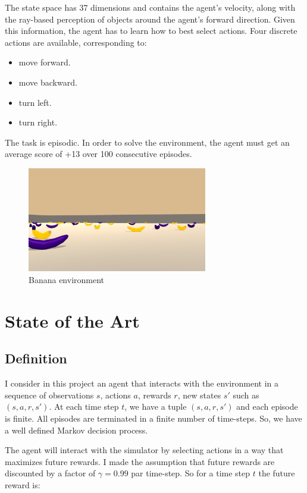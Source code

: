 \documentclass[12pt]{article}
\begin{document}
The state space has 37 dimensions and contains the agent's velocity, along with the ray-based perception of objects around the agent's forward direction. Given this information, the agent has to learn how to best select actions. Four discrete actions are available, corresponding to:

\begin{itemize}
\item move forward.
\item move backward.
\item turn left.
\item turn right.
\end{itemize}
 
The task is episodic. In order to solve the environment, the agent must get an average score of +13 over 100 consecutive episodes.
\begin{center}
\begin{figure}[H]
  \center
  \includegraphics[width=0.7\textwidth]{../PNG/env.png}
  \caption{Banana environment}
  \label{fig:banana_environment}
\end{figure}
\end{center}
\section{State of the Art}
\subsection{Definition}
I consider in this project an agent that interacts with the environment in a sequence of observations $s$, actions $a$, rewards $r$, new states $s'$ such as $(s,a,r,s')$.
At each time step $t$, we have a tuple $(s,a,r,s')$  and each episode is finite. All episodes are terminated in a finite number of time-steps. 
So, we have a well defined Markov decision process. 
 
The agent will interact with the simulator by selecting actions in a way that maximizes future rewards. 
I made the assumption that future rewards are discounted by a factor of $\gamma =0.99$ par time-step. So for a time step $t$ the future reward is:
\end{document}
